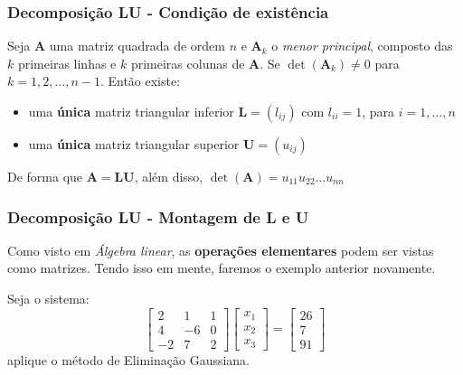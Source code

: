 \documentclass{beamer}
\theoremstyle{mystyle}
\begin{document}
\begin{frame}
	\frametitle{Decomposição LU - Condição de existência}
	Seja \textbf{A} uma matriz quadrada de ordem $ n $ e $ \mathbf{A}_{k} $ o \textit{menor	principal}, composto das $ k $ primeiras linhas e $ k $ primeiras colunas de \textbf{A}. Se $ \det(\mathbf{A}_{k})\neq 0 $ para $ k = 1, 2, \ldots , n - 1 $. Então existe:
	\begin{itemize}
		\item uma \textbf{única} matriz triangular inferior $ \mathbf{L} = (l_{ij})$ com $ l_{ii} = 1 $, para $ i = 1, \ldots , n $
		\item  uma \textbf{única} matriz triangular superior $ \mathbf{U} = (u_{ij})$
	\end{itemize}
	De forma que $ \mathbf{A} = \mathbf{LU} $, além disso, $ \det(\mathbf{A}) = u_{11}u_{22}\ldots u_{nn} $
\end{frame}

\begin{frame}
	\frametitle{Decomposição LU - Montagem de L e U}
	Como visto em \textit{Álgebra linear}, as \textbf{operações elementares} podem ser vistas como matrizes. Tendo isso em mente, faremos o exemplo anterior novamente.
	
	Seja o sistema:
	\begin{equation*}
		\left[
		\begin{array}{ccc}
			2 & 1 & 1  \\
			4 & -6 & 0  \\
			-2 & 7 & 2
		\end{array}
		\right] 
		\begin{bmatrix} x_{1} \\ x_{2} \\ x_{3} \end{bmatrix}
		=
		\begin{bmatrix} 26 \\ 7 \\ 91 \end{bmatrix}
	\end{equation*}
	aplique o método de Eliminação Gaussiana.
\end{frame}
\end{document}
